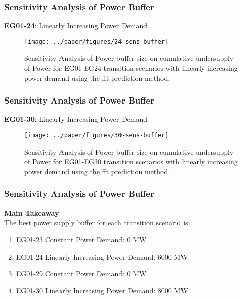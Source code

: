 \begin{frame}
    \frametitle{Sensitivity Analysis of Power Buffer}
    \textbf{EG01-24}: Linearly Increasing Power Demand
    \begin{figure}[htbp!]
        \begin{center}
          \texttt{[image: ../paper/figures/24-sens-buffer]}
        \end{center}
              \caption{Sensitivity Analysis of Power buffer size on cumulative 
              undersupply of Power for EG01-EG24 transition scenarios 
              with linearly increasing power demand using the fft prediction method.}
      \end{figure}
\end{frame}

\begin{frame}
    \frametitle{Sensitivity Analysis of Power Buffer}
    \textbf{EG01-30}: Linearly Increasing Power Demand
    \begin{figure}[htbp!]
        \begin{center}
          \texttt{[image: ../paper/figures/30-sens-buffer]}
        \end{center}
              \caption{Sensitivity Analysis of Power buffer size on cumulative 
              undersupply of Power for EG01-EG30 transition scenarios 
              with linearly increasing power demand using the fft prediction method.}
      \end{figure}
\end{frame}

\begin{frame}
  \frametitle{Sensitivity Analysis of Power Buffer}
  \textbf{Main Takeaway}
  \\
  The best power supply buffer for each transition scenario is: 
  \begin{enumerate}
    \item EG01-23 Constant Power Demand: 0 MW
    \item EG01-24 Linearly Increasing Power Demand: 6000 MW
    \item EG01-29 Constant Power Demand: 0 MW
    \item EG01-30 Linearly Increasing Power Demand: 8000 MW 
\end{enumerate}
\end{frame}